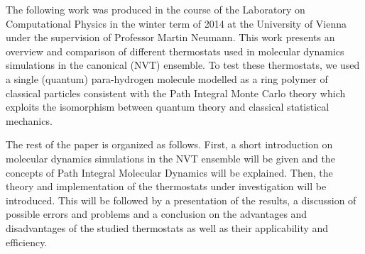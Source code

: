 The following work was produced in the course of the Laboratory on Computational Physics in the winter term of 2014 at the University of Vienna under the supervision of Professor Martin Neumann. This work presents an overview and comparison of different thermostats used in molecular dynamics simulations in the canonical (NVT) ensemble. To test these thermostats, we used a single (quantum) para-hydrogen molecule modelled as a ring polymer of classical particles consistent with the Path Integral Monte Carlo theory which exploits the isomorphism between quantum theory and classical statistical mechanics.

The rest of the paper is organized as follows. First, a short introduction on molecular dynamics simulations in the NVT ensemble will be given and the concepts of Path Integral Molecular Dynamics will be explained. Then, the theory and implementation of the thermostats under investigation will be introduced. This will be followed by a presentation of the results, a discussion of possible errors and problems and a conclusion on the advantages and disadvantages of the studied thermostats as well as their applicability and efficiency. 
